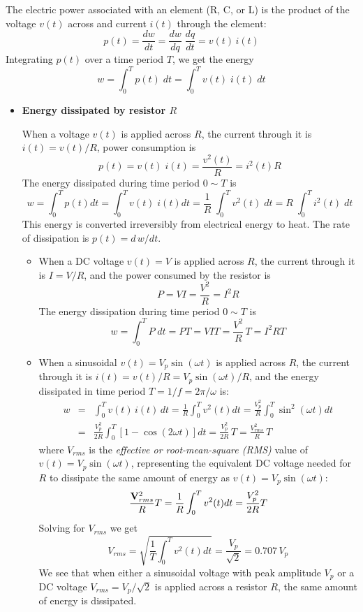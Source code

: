 \begin{itemize}
The electric power associated with an element (R, C, or L) is the 
product of the voltage $v(t)$ across and current $i(t)$ through the
element:
\[ 
p(t)=\frac{dw}{dt}=\frac{dw}{dq}\;\frac{dq}{dt}=v(t)\,i(t)
\]
Integrating $p(t)$ over a time period $T$, we get the energy 
\[
w=\int_0^T p(t)\; dt=\int_0^T v(t)\; i(t)\; dt	
\]
\begin{itemize}
Depending on its sign, the energy can be either consumed (dissipated,
converted to heat) if $w>0$, or stored in the element if $w<0$. We 
consider specifically the energy dissipation/storage in each of 
the three types of elements $R$, $C$, and $L$.

\item {\bf Energy dissipated by resistor $R$}

  When a voltage $v(t)$ is applied across $R$, the current through it is
  $i(t)=v(t)/R$, power consumption is 
  \[ 
  p(t)=v(t)\;i(t)=\frac{v^2(t)}{R}=i^2(t)R 
  \]
  The energy dissipated during time period $0 \sim T$ is
  \[
  w=\int_0^T p(t) dt=\int_0^T v(t)\; i(t) dt
  =\frac{1}{R}\;\int_0^T v^2(t)\; dt =R\;\int_0^T i^2(t)\; dt 
  \]
  This energy is converted irreversibly from electrical energy to heat. The 
  rate of dissipation is $p(t)=d\,w/dt$.

  \begin{itemize}
    \item When a DC voltage $v(t)=V$ is applied across $R$, the current 
      through it is $I=V/R$, and the power consumed by the resistor is 
      \[
      P=VI=\frac{V^2}{R}=I^2R 
      \]
      The energy dissipation during time period $0\sim T$ is
      \[ 
      w=\int_0^T P\; dt=PT=VIT=\frac{V^2}{R}\,T=I^2RT 
      \]
    \item When a sinusoidal $v(t)=V_p \sin(\omega t)$ is applied across $R$, 
      the current through it is $i(t)=v(t)/R=V_p\sin(\omega t)/R$, and the 
      energy dissipated in time period $T=1/f=2\pi/\omega$ is:
      \begin{eqnarray}
      w&=&\int_0^T v(t)\,i(t)\,dt=\frac{1}{R}\int_0^T v^2(t) dt
      =\frac{V_p^2}{R}\int_0^T \sin^2(\omega t) dt
      \nonumber \\
      &=&\frac{V_p^2}{2R}\int_0^T [1-\cos(2\omega t)] dt=\frac{V_p^2}{2R}\,T
      =\frac{V^2_{rms}}{R}\,T
      \nonumber 
      \end{eqnarray}
      where $V_{rms}$ is the {\em effective or root-mean-square (RMS)} value 
      of $v(t)=V_p\sin(\omega t)$, representing the equivalent DC voltage
      needed for $R$ to dissipate the same amount of energy as 
      $v(t)=V_p\sin(\omega t)$:
      \[ 
      \frac{{\bf V}^2_{rms}}{R}T=\frac{1}{R}\int_0^T v^2(t)dt
      =\frac{V_p^2}{2R}T
      \]
      Solving for $V_{rms}$ we get
      \[ 
      V_{rms}=\sqrt{\frac{1}{T}\int_0^T v^2(t) dt }=\frac{V_p}{\sqrt{2}}=0.707\,V_p
      \]
      We see that when either a sinusoidal voltage with peak amplitude $V_p$ 
      or a DC voltage $V_{rms}=V_p/\sqrt{2}$ is applied across a resistor $R$, 
      the same amount of energy is dissipated.
   

\end{itemize}
\end{itemize}
\end{itemize}
